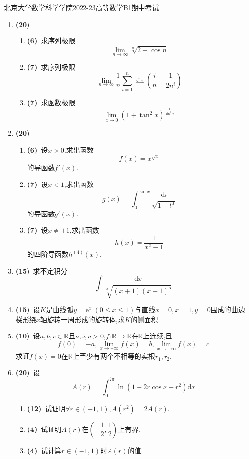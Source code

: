\documentclass{ctexart}
\newcommand{\e}{\mathrm{e}}
\newcommand{\di}{\mathrm{d}}
\newcommand{\R}{\mathbb{R}}
\newcommand{\dx}{\di x}
\begin{document}
\pagestyle{empty}

\begin{center}\Large
    北京大学数学科学学院2022-23高等数学B1期中考试
\end{center}
\begin{enumerate}[leftmargin=*,label=\textbf{\arabic*.}]
    \item \textbf{(20)}
        \begin{enumerate}[label=\textbf{(\arabic*)},leftmargin=*]
            \item \textbf{(6)}\ 求序列极限$$\lim_{n\to\infty}{\sqrt[n]{2+\cos n}}$$
            \item \textbf{(7)}\ 求序列极限$$\lim_{n\to\infty}{\dfrac{1}{n}\sum_{i=1}^{n}{\sin\left(\dfrac{i}{n}-\dfrac{1}{2n^i}\right)}}$$
            \item \textbf{(7)}\ 求函数极限$$\lim_{x\to0}{\left(1+\tan^2 x\right)^{\frac{1}{\sin^2 x}}}$$
        \end{enumerate}
    \item \textbf{(20)}
        \begin{enumerate}[label=\textbf{(\arabic*)},leftmargin=*]
            \item \textbf{(6)}\ 设$x>0$,求出函数$$f(x)=x^{\sqrt{x}}$$的导函数$f'(x)$.
            \item \textbf{(7)}\ 设$x<1$,求出函数$$g(x)=\int_0^{\sin x}\dfrac{\di t}{\sqrt{1-t^3}}$$的导函数$g'(x)$.
            \item \textbf{(7)}\ 设$x\neq\pm 1$,求出函数$$h(x)=\dfrac{1}{x^2-1}$$的四阶导函数$h^{(4)}(x)$.
        \end{enumerate}
    \item \textbf{(15)}\ 求不定积分$$\int{\dfrac{\dx}{\sqrt[3]{(x+1)(x-1)^5}}}$$
    \item \textbf{(15)}\ 设$K$是曲线弧$y=\e^x\ (0\leqslant x\leqslant 1)$与直线$x=0,x=1,y=0$围成的曲边梯形绕$x$轴旋转一周形成的旋转体,求$K$的侧面积.
    \item \textbf{(10)}\ 设$a,b,c\in\R$且$a,b,c>0$,$f:\R\to\R$在$\R$上连续,且$$f(0)=-a,\lim_{x\to-\infty}f(x)=b,\lim_{x\to+\infty}f(x)=c$$求证$f(x)=0$在$\R$上至少有两个不相等的实根$r_1,r_2$.
    \item \textbf{(20)}\ 设$$A(r)=\int_0^{2\pi}\ln(1-2r\cos x+r^2)\dx$$
        \begin{enumerate}[label=\textbf{(\arabic*)},leftmargin=*]
            \item \textbf{(12)}\ 试证明$\displaystyle\forall r\in(-1,1),A(r^2)=2A(r)$.
            \item \textbf{(4)}\ 试证明$A(r)$在$\left(-\dfrac{1}{2},\dfrac{1}{2}\right)$上有界.
            \item \textbf{(4)}\ 试计算$r\in(-1,1)$时$A(r)$的值.
        \end{enumerate}
\end{enumerate}
\end{document}
